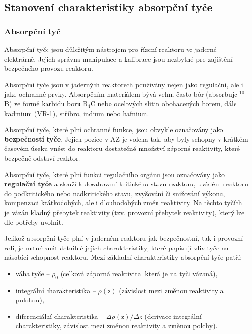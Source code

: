 \subsection{Stanovení charakteristiky absorpční tyče}

\subsubsection{Absorpční tyč}

Absorpční tyče jsou důležitým nástrojem pro řízení reaktoru ve jaderné elektrárně. Jejich správná manipulace a kalibrace jsou nezbytné pro zajištění bezpečného provozu reaktoru.

Absorpční tyče jsou v jaderných reaktorech používány nejen jako regulační, ale i jako ochranné prvky. Absorpčním materiálem bývá velmi často bór (absorbuje $^{10}$B) ve formě karbidu boru B$_4$C nebo ocelových slitin obohacených borem, dále kadmium (VR-1), stříbro, indium nebo hafnium. 

Absorpční tyče, které plní ochranné funkce, jsou obvykle označovány jako \textbf{bezpečností tyče}. Jejich pozice v AZ je volena tak, aby byly schopny v krátkém časovém úseku vnést do reaktoru dostatečné množství záporné reaktivity, které bezpečně odstaví reaktor. 

Absorpční tyče, které plní funkci regulačního orgánu jsou označovány jako \textbf{regulační tyče} a slouží k dosahování kritického stavu reaktoru, uvádění reaktoru do podkritického nebo nadkritického stavu, zvyšování či snižování výkonu, kompenzaci krátkodobých, ale i dlouhodobých změn reaktivity. Na těchto tyčích je vázán kladný přebytek reaktivity (tzv. provozní přebytek reaktivity), který lze dle potřeby uvolnit.

Jelikož absorpční tyče plní v jaderném reaktoru jak bezpečnostní, tak i provozní roli, je nutné znát detailně jejich charakteristiky, které popisují vliv tyče na násobící schopnost reaktoru. Mezi základní charakteristiky absorpční tyče patří:

\begin{itemize}
    \item váha tyče -- $\rho_0$ (celková záporná reaktivita, která je na tyči vázaná),
    \item integrální charakteristika -- $\rho(\text{z})$ (závislost mezi změnou reaktivity a polohou),
    \item diferenciální charakteristika -- $\Delta\rho(\text{z})/\Delta z$ (derivace integrální charakteristiky, závislost mezi změnou reaktivity a změnou polohy).
\end{itemize}

